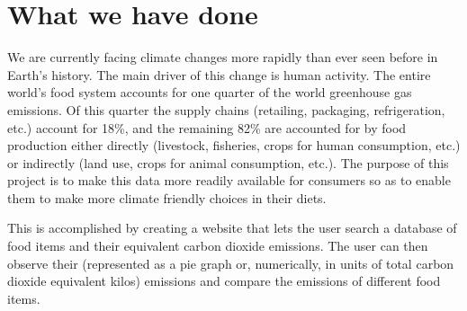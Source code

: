 \section{What we have done}
We are currently facing climate changes more rapidly than ever seen before in Earth’s history. The main driver of this change is human activity. The entire world’s food system accounts for one quarter of the world greenhouse gas emissions. Of this quarter the supply chains (retailing, packaging, refrigeration, etc.) account for 18\%, and the remaining 82\% are accounted for by food production either directly (livestock, fisheries, crops for human consumption, etc.) or indirectly (land use, crops for animal consumption, etc.)\cite{FoodStat}. The purpose of this project is to make this data more readily available for consumers so as to enable them to make more climate friendly choices in their diets. 

This is accomplished by creating a website that lets the user search a database of food items and their equivalent carbon dioxide emissions. The user can then observe their (represented as a pie graph or, numerically, in units of total carbon dioxide equivalent kilos) emissions and compare the emissions of different food items. 
